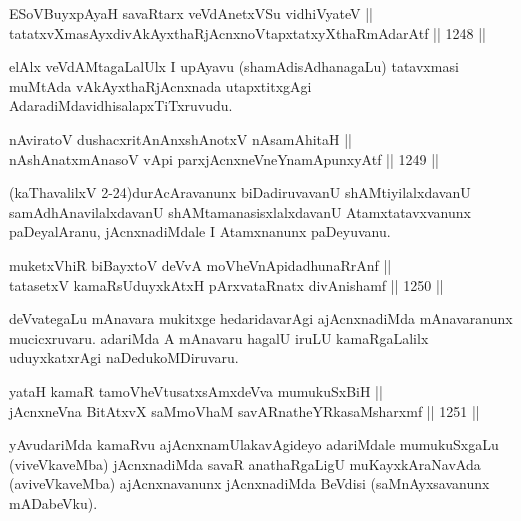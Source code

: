\begin{shl}
ESoV\s BuyxpAyaH savaRtarx veVdAnetxVSu vidhiVyateV || \\
tatatxvXmasAyxdivAkAyxthaRjAcnxnoVtapxtatxyXthaRmAdarAtf \hfill || 1248 ||  
\end{shl}

\begin{artha}
elAlx veVdAMtagaLalUlx I upAyavu (shamAdisAdhanagaLu) tatavxmasi muMtAda vAkAyxthaRjAcnxnada utapxtitxgAgi AdaradiMda\break vidhisalapxTiTxruvudu.
\end{artha}


\begin{shl}
nAviratoV dushacxritAnAnxshAnotxV nAsamAhitaH || \\
nAshAnatxmAnasoV vA\s pi parxjAcnxneVneYnamApunxyAtf \hfill || 1249 ||  
\end{shl}

\begin{artha}
(kaThavalilxV 2-24)durAcAravanunx biDadiruvavanU shAMti\-\break yilalxdavanU samAdhAnavilalxdavanU shAMtamanasisxlalxdavanU Atamxtatavxvanunx paDeyalAranu, jAcnxnadiMdale I Atamxnanunx paDeyuvanu.
\end{artha}


\begin{shl}
muketxVhiR biBayxtoV deVvA moVheVnApidadhunaRrAnf || \\
tatasetxV kamaRsUduyxkAtxH pArxvataRnatx divAnishamf \hfill || 1250 ||  
\end{shl}

\begin{artha}
deVvategaLu mAnavara mukitxge hedaridavarAgi ajAcnxnadiMda mAnavaranunx mucicxruvaru. adariMda A mAnavaru hagalU iruLU kamaRgaLalilx uduyxkatxrAgi naDedukoMDiruvaru.
\end{artha}


\begin{shl}
yataH kamaR tamoVheVtusatxsAmxdeVva mumukuSxBiH || \\
jAcnxneVna BitAtxvX saMmoVhaM savARnatheYRkasaMsharxmf \hfill || 1251 ||  
\end{shl}

\begin{artha}
yAvudariMda kamaRvu ajAcnxnamUlakavAgideyo adariMdale mumukuSxgaLu (viveVkaveMba) jAcnxnadiMda savaR anathaRgaLigU muKayxkAraNavAda (aviveVkaveMba) ajAcnxnavanunx jAcnxnadiMda BeVdisi (saMnAyxsavanunx mADabeVku).
\end{artha}

